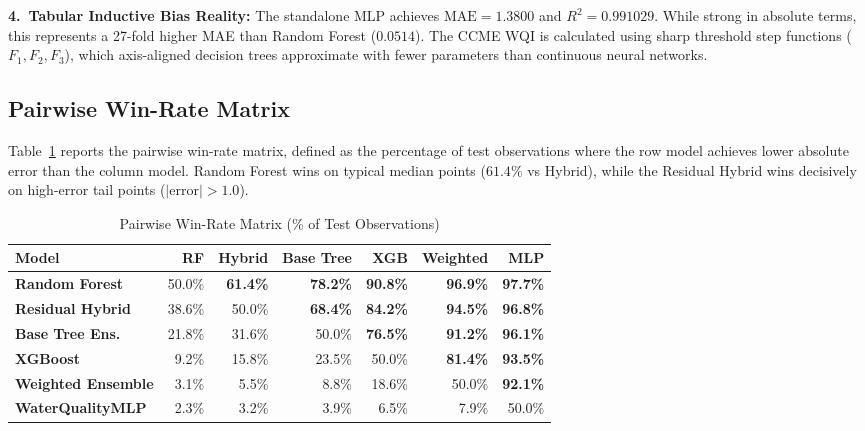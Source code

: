 \documentclass[conference]{IEEEtran}
\begin{document}
\noindent\textbf{4.\ Tabular Inductive Bias Reality:}
The standalone MLP achieves $\text{MAE} = 1.3800$ and $R^2 = 0.991029$. While strong in
absolute terms, this represents a 27-fold higher MAE than Random Forest ($0.0514$).
The CCME WQI is calculated using sharp threshold step functions ($F_1, F_2, F_3$),
which axis-aligned decision trees approximate with fewer parameters than continuous neural networks.

\subsection{Pairwise Win-Rate Matrix}
Table~\ref{tab:winrate} reports the pairwise win-rate matrix, defined as the percentage
of test observations where the row model achieves lower absolute error than the column model.
Random Forest wins on typical median points ($61.4\%$ vs Hybrid), while the Residual Hybrid
wins decisively on high-error tail points ($|\text{error}| > 1.0$).

\begin{table}[!t]
  \caption{Pairwise Win-Rate Matrix (\% of Test Observations)}
  \label{tab:winrate}
  \centering
  \setlength{\tabcolsep}{3pt}
  \scriptsize
  \begin{tabular}{lrrrrrr}
    \toprule
    \textbf{Model} & \textbf{RF} & \textbf{Hybrid} & \textbf{Base Tree} & \textbf{XGB} & \textbf{Weighted} & \textbf{MLP} \\
    \midrule
    \textbf{Random Forest}     & 50.0\% & \textbf{61.4\%} & \textbf{78.2\%} & \textbf{90.8\%} & \textbf{96.9\%} & \textbf{97.7\%} \\
    \textbf{Residual Hybrid}   & 38.6\% & 50.0\%          & \textbf{68.4\%} & \textbf{84.2\%} & \textbf{94.5\%} & \textbf{96.8\%} \\
    \textbf{Base Tree Ens.}    & 21.8\% & 31.6\%          & 50.0\%          & \textbf{76.5\%} & \textbf{91.2\%} & \textbf{96.1\%} \\
    \textbf{XGBoost}           &  9.2\% & 15.8\%          & 23.5\%          & 50.0\%          & \textbf{81.4\%} & \textbf{93.5\%} \\
    \textbf{Weighted Ensemble} &  3.1\% &  5.5\%          &  8.8\%          & 18.6\%          & 50.0\%          & \textbf{92.1\%} \\
    \textbf{WaterQualityMLP}   &  2.3\% &  3.2\%          &  3.9\%          &  6.5\%          &  7.9\%          & 50.0\% \\
    \bottomrule
  \end{tabular}
\end{table}
\end{document}
